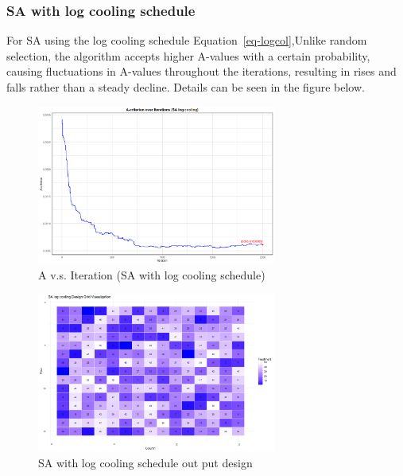 \documentclass[
  a4paper,
  oneside,
  openany,
  12pt,
  onecolumn]{book}
\theoremstyle{definition}
\theoremstyle{plain}
\theoremstyle{remark}
\begin{document}
\subsubsection{SA with log cooling
schedule}\label{sa-with-log-cooling-schedule}

For SA using the log cooling schedule Equation~\ref{eq-logcol},Unlike
random selection, the algorithm accepts higher A-values with a certain
probability, causing fluctuations in A-values throughout the iterations,
resulting in rises and falls rather than a steady decline. Details can
be seen in the figure below.

\begin{figure}[H]

{\centering \includegraphics[width=0.7\textwidth,height=\textheight]{images/Rplots/SA_SLOW example.png}

}

\caption{A v.s. Iteration (SA with log cooling schedule)}

\end{figure}%
\begin{figure}[H]

{\centering \includegraphics[width=0.7\textwidth,height=\textheight]{images/Rplots/SA_SLOW visualization.png}

}

\caption{SA with log cooling schedule out put design}

\end{figure}%
\end{document}
